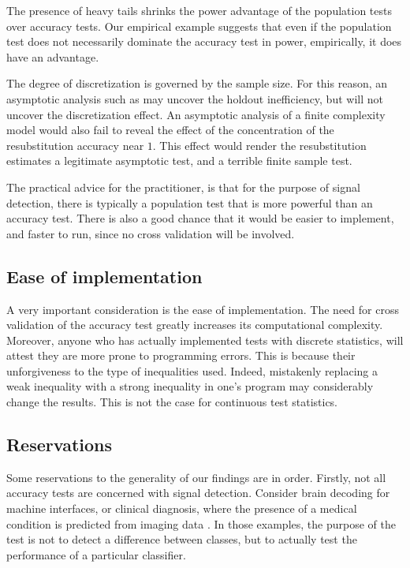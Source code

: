 \documentclass[12pt,a4paper]{article}
\theoremstyle{definition}
\begin{document}
The presence of heavy tails shrinks the power advantage of the population tests over accuracy tests. 
Our empirical example suggests that even if the population test does not necessarily dominate the accuracy test in power, empirically, it does have an advantage. 


The degree of discretization is governed by the sample size. 
For this reason, an asymptotic analysis such as \cite{ramdas_classification_2016} may uncover the holdout inefficiency, but will not uncover the discretization effect. 
An asymptotic analysis of a finite complexity model would also fail to reveal the effect of the concentration of the resubstitution accuracy near $1$. This effect would render the resubstitution estimates a legitimate asymptotic test, and a terrible finite sample test. 

The practical advice for the practitioner, is that for the purpose of signal detection, there is typically a population test that is more powerful than an accuracy test. 
There is also a good chance that it would be easier to implement, and faster to run, since no cross validation will be involved. 



\subsection{Ease of implementation}
A very important consideration is the ease of implementation. 
The need for cross validation of the accuracy test greatly increases its computational complexity. 
Moreover, anyone who has actually implemented tests with discrete statistics, will attest they are more prone to programming errors. 
This is because their unforgiveness to the type of inequalities used. 
Indeed, mistakenly replacing a weak inequality with a strong inequality in one's program may considerably change the results. 
This is not the case for continuous test statistics. 




\subsection{Reservations}
\label{sec:reservations}

Some reservations to the generality of our findings are in order. 
Firstly, not all accuracy tests are concerned with signal detection.
Consider brain decoding for machine interfaces, or clinical diagnosis, where the presence of a medical condition is predicted from imaging data \citep[e.g.][]{olivetti_induction_2012,wager_fmri-based_2013}. 
In those examples, the purpose of the test is not to detect a difference between classes, but to actually test the performance of a particular classifier.  
\end{document}
